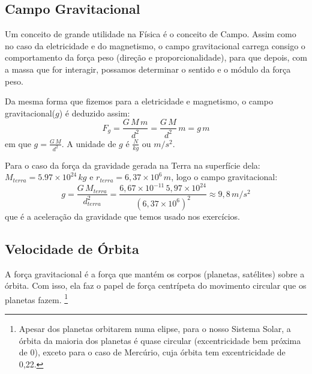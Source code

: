\documentclass[12pt]{extarticle}
\newcommand{\<}{\langle}
\renewcommand{\>}{\rangle}
\theoremstyle{definition}
\begin{document}
\subsection{Campo Gravitacional}
Um conceito de grande utilidade na Física é o conceito de Campo. Assim como no caso da eletricidade e do magnetismo, o campo gravitacional carrega consigo o comportamento da força peso (direção e proporcionalidade), para que depois, com a massa que for interagir, possamos determinar o sentido e o módulo da força peso. 

Da mesma forma que fizemos para a eletricidade e magnetismo, o campo gravitacional($g$) é deduzido assim:
\begin{equation}
    F_{g} = \frac{G\,M\,m}{d^2}  = \frac{G\,M}{d^2}\,m = g\,m
\end{equation}
\noindent em que $g = \frac{G\,M}{d^2}$. A unidade de $g$ é $\frac{N}{kg}$ ou $m/s^2$.

Para o caso da força da gravidade gerada na Terra na superfície dela: $M_{terra} = 5.97\times10^{24}\,kg$ e $r_{terra} = 6,37\times10^6\,m$, logo o campo gravitacional:
\begin{equation}
    g = \frac{G\,M_{terra}}{d_{terra}^2} = \frac{6,67\times10^{-11}\,5,97\times10^{24}}{(6,37\times10^{6})^2} \approx 9,8\,m/s^2 
\end{equation}
\noindent que é a aceleração da gravidade que temos usado nos exercícios.

\subsection{Velocidade de Órbita}
A força gravitacional é a força que mantém os corpos (planetas, satélites) sobre a órbita. Com isso, ela faz o papel de força centrípeta do movimento circular que os planetas fazem. \footnote{Apesar dos planetas orbitarem numa elipse, para o nosso Sistema Solar, a órbita da maioria dos planetas é quase circular (excentricidade bem próxima de 0), exceto para o caso de Mercúrio, cuja órbita tem excentricidade de 0,22.} 
\end{document}
